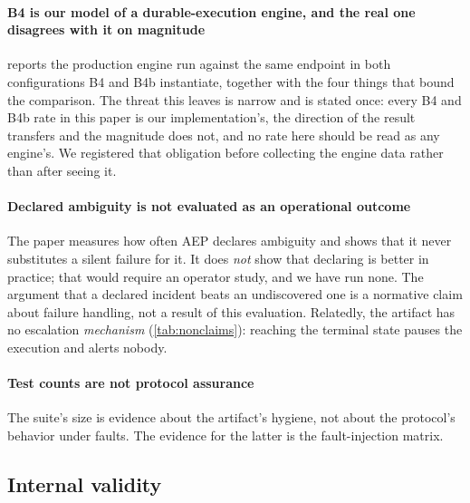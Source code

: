 \paragraph{B4 is our model of a durable-execution engine, and the real one
disagrees with it on magnitude}  reports the production
engine run against the same endpoint in both configurations B4 and B4b
instantiate, together with the four things that bound the comparison. The threat
this leaves is narrow and is stated once: every B4 and B4b rate in this paper is
our implementation's, the direction of the result transfers and the magnitude
does not, and no rate here should be read as any engine's. We registered that
obligation before collecting the engine data rather than after seeing it.

\paragraph{Declared ambiguity is not evaluated as an operational outcome} The
paper measures how often AEP declares ambiguity and shows that it never
substitutes a silent failure for it. It does \emph{not} show that declaring is
better in practice; that would require an operator study, and we have run none.
The argument that a declared incident beats an undiscovered one is a normative
claim about failure handling, not a result of this evaluation. Relatedly, the
artifact has no escalation \emph{mechanism} (\cref{tab:nonclaims}): reaching the
terminal state pauses the execution and alerts nobody.

\paragraph{Test counts are not protocol assurance} The suite's size is evidence
about the artifact's hygiene, not about the protocol's behavior under faults.
The evidence for the latter is the fault-injection matrix.

\subsection{Internal validity}

